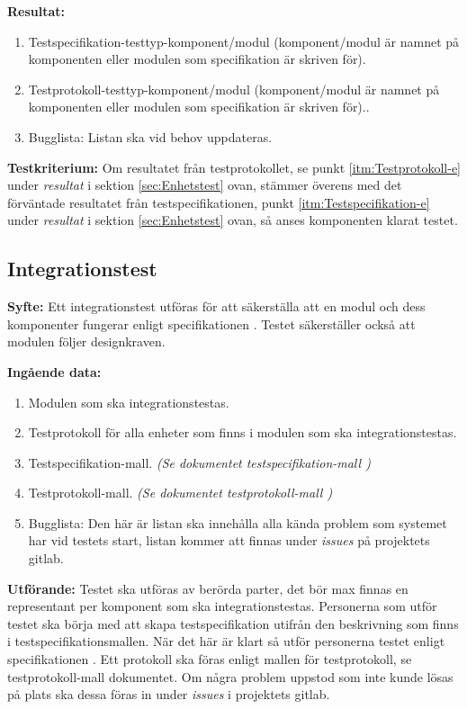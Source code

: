 \documentclass[a4paper,10pt]{article}
\begin{document}
    \textbf{Resultat:}
        \begin{enumerate}
            \item \label{itm:Testspecifikation-e} Testspecifikation-testtyp-komponent/modul (komponent/modul är namnet på komponenten eller modulen som specifikation är skriven för).
            \item \label{itm:Testprotokoll-e} Testprotokoll-testtyp-komponent/modul (komponent/modul är namnet på komponenten eller modulen som specifikation är skriven för)..
            \item Bugglista: Listan ska vid behov uppdateras.
        \end{enumerate}
    \textbf{Testkriterium:} Om resultatet från testprotokollet, se punkt \ref{itm:Testprotokoll-e} under \emph{resultat} i sektion \ref{sec:Enhetstest} ovan, stämmer överens med det förväntade resultatet från testspecifikationen, punkt \ref{itm:Testspecifikation-e} under \emph{resultat} i sektion \ref{sec:Enhetstest} ovan, så anses komponenten klarat testet.

\subsection{Integrationstest}
\label{sec:Integrationstest}
\textbf{Syfte:}
Ett integrationstest utföras för att säkerställa att en modul och dess komponenter fungerar enligt specifikationen \cite{kravspec}. Testet säkerställer också att modulen följer designkraven.

\textbf{Ingående data:}
    \begin{enumerate}
        \item Modulen som ska integrationstestas.
        \item Testprotokoll för alla enheter som finns i modulen som ska integrationstestas.
        \item Testspecifikation-mall. \emph{(Se dokumentet testspecifikation-mall \cite{testspec-mall})}
        \item Testprotokoll-mall. \emph{(Se dokumentet testprotokoll-mall \cite{testprot-mall})}
        \item Bugglista: Den här är listan ska innehålla alla kända problem som systemet har vid testets start, listan kommer att finnas under \emph{issues} på projektets gitlab.
    \end{enumerate}

\textbf{Utförande:} Testet ska utföras av berörda parter, det bör max finnas en representant per komponent som ska integrationstestas. Personerna som utför testet ska börja med att skapa testspecifikation utifrån den beskrivning som finns i testspecifikationsmallen. När det här är klart så utför personerna testet enligt specifikationen \cite{kravspec}. Ett protokoll ska föras enligt mallen för testprotokoll, se testprotokoll-mall dokumentet. Om några problem uppstod som inte kunde lösas på plats ska dessa föras in under \emph{issues} i projektets gitlab.
\end{document}
